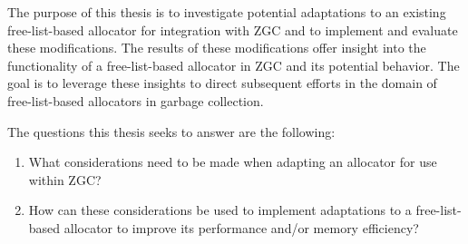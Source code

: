 The purpose of this thesis is to investigate potential adaptations to an existing free-list-based allocator for integration with ZGC and to implement and evaluate these modifications. The results of these modifications offer insight into the functionality of a free-list-based allocator in ZGC and its potential behavior. The goal is to leverage these insights to direct subsequent efforts in the domain of free-list-based allocators in garbage collection.

The questions this thesis seeks to answer are the following:
\begin{enumerate}
  \item What considerations need to be made when adapting an allocator for use within ZGC?
  \item How can these considerations be used to implement adaptations to a free-list-based allocator to improve its performance and/or memory efficiency?
\end{enumerate}

